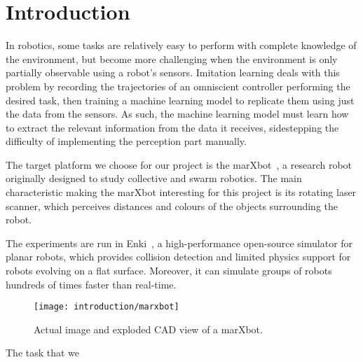 \section{Introduction}

In robotics, some tasks are relatively easy to perform with complete knowledge 
of the environment, but become more challenging when the environment is only 
partially observable using a robot's sensors. Imitation learning deals with 
this problem by recording the trajectories of an omniscient controller 
performing the desired task, then training a machine learning model to 
replicate them using just the data from the sensors. As such, the machine 
learning model must learn how to extract the relevant information from the data 
it receives, sidestepping the difficulty of implementing the perception part 
manually.

The target platform we choose for our project is the 
marXbot~\cite{bonani2010marxbot}, a research robot originally designed to study 
collective and swarm robotics. The main characteristic making the marXbot 
interesting for this project is its rotating laser scanner, which perceives 
distances and colours of the objects surrounding the robot.

The experiments are run in Enki~\cite{enki}, a high-performance open-source 
simulator for planar robots, which provides collision detection and limited 
physics support for robots evolving on a flat surface. Moreover, it can 
simulate groups of robots hundreds of times faster than real-time.

\begin{figure}[htbp]
	\centerline{\texttt{[image: introduction/marxbot]}}
	\caption{Actual image and exploded CAD view of a marXbot.}
	\label{fig:marxbot}
\end{figure}

The task that we 

% 
